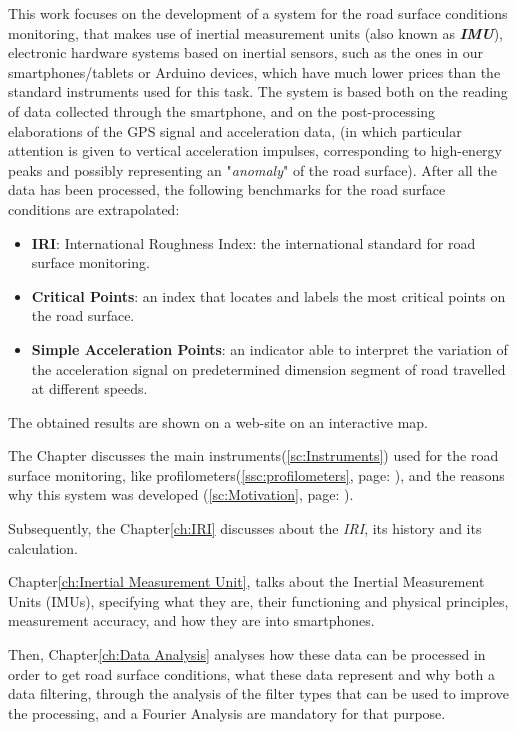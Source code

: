 \documentclass[tesi]{subfiles}
\begin{document}
This work focuses on the development of a system for the road surface conditions monitoring, that makes use of inertial measurement units (also known as \textbf{\textit{IMU}}), electronic hardware systems based on inertial sensors, such as the ones in our smartphones/tablets or Arduino devices, which have much lower prices than the standard instruments used for this task.
The system is based both on the reading of data collected through the smartphone, and on the post-processing elaborations of the GPS signal and acceleration data, (in which particular attention is given to vertical acceleration impulses, corresponding to high-energy peaks and possibly representing an "\textit{anomaly}" of the road surface).
After all the data has been processed, the following benchmarks for the road surface conditions are extrapolated:
\begin{itemize}\label{it:indexes}
\item \textbf{IRI}: International Roughness Index: the international standard for road surface monitoring.
\item \textbf{Critical Points}: an index that locates and labels the most critical points on the road surface.
\item \textbf{Simple Acceleration Points}: an indicator able to interpret the variation of the acceleration signal on predetermined dimension segment of road travelled at different speeds.
\end{itemize}

The obtained results are shown on a web-site on an interactive map.

The  Chapter discusses the main instruments{\footnotesize (\ref{sc:Instruments})} used for the road surface monitoring, like profilometers{\footnotesize (\ref{ssc:profilometers}, page: \pageref{ssc:profilometers})}, and the reasons why this system was developed  {\footnotesize (\ref{sc:Motivation}, page: \pageref{sc:Motivation})}.


Subsequently, the Chapter\ref{ch:IRI} discusses about the \textit{IRI}, its history and its calculation.


Chapter\ref{ch:Inertial Measurement Unit}, talks about the Inertial Measurement Units (IMUs), specifying what they are, their functioning and physical principles, measurement accuracy, and how they are into smartphones.


Then, Chapter\ref{ch:Data Analysis} analyses  how these data can be processed in order to get road surface conditions, what these data represent and why both a data filtering, through the analysis of the filter types that can be used to improve the processing, and a Fourier Analysis are mandatory for that purpose.
\end{document}
